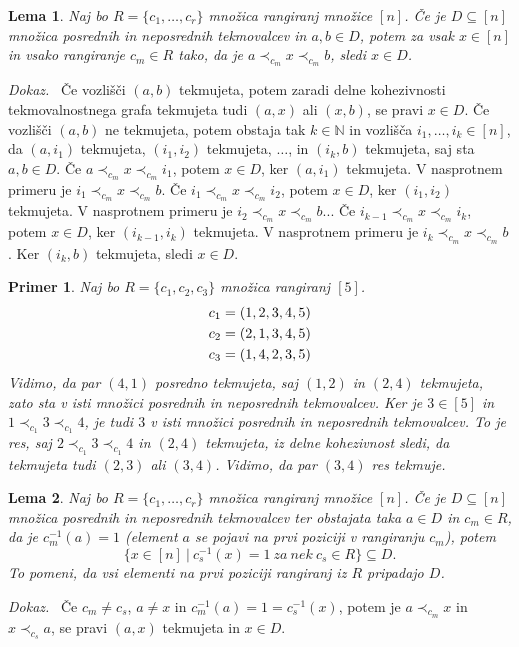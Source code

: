\documentclass[a4paper, 12pt]{book}
\newtheorem{lema}{Lema}[chapter]
\newtheorem{primer}{Primer}[chapter]
\newenvironment{dokaz}{\emph{Dokaz.}\ }{\hspace{\fill}{$\Box$}}
\begin{document}
\begin{lema}
\label{lema_algoritem_posredni_tekmovalci_1}
    Naj bo $R = \{ c_1, \dots, c_r \}$ množica rangiranj množice $[n]$. Če je $D \subseteq [n]$ množica posrednih in neposrednih tekmovalcev in $a, b \in D$, potem za vsak $x \in [n]$ in vsako rangiranje $c_m \in R$ tako, da je $a \prec_{c_m} x \prec_{c_m} b$, sledi $x \in D$.
\end{lema}
\begin{dokaz}
    Če vozlišči $(a, b)$ tekmujeta, potem zaradi delne kohezivnosti tekmovalnostnega grafa tekmujeta tudi $(a, x)$ ali $(x, b)$, se pravi $x \in D$. Če vozlišči $(a, b)$ ne tekmujeta, potem obstaja tak $k \in \mathbb{N}$ in vozlišča $i_1, \dots, i_k \in [n]$, da $(a, i_1)$ tekmujeta, $(i_1, i_2)$ tekmujeta, $\dots$, in $(i_k, b)$ tekmujeta, saj sta $a,b \in D$. Če $a \prec_{c_m} x \prec_{c_m} i_1$, potem $x \in D$, ker $(a, i_1)$ tekmujeta. V nasprotnem primeru je $i_1 \prec_{c_m} x \prec_{c_m} b$. Če $i_1 \prec_{c_m} x \prec_{c_m} i_2$, potem $x \in D$, ker $(i_1, i_2)$ tekmujeta. V nasprotnem primeru je $i_2 \prec_{c_m} x \prec_{c_m} b$... Če $i_{k-1} \prec_{c_m} x \prec_{c_m} i_k$, potem $x \in D$, ker $(i_{k-1}, i_k)$ tekmujeta. V nasprotnem primeru je $i_k \prec_{c_m} x \prec_{c_m} b$. Ker $(i_k, b)$ tekmujeta, sledi $x \in D$.
\end{dokaz}

\begin{primer}
    Naj bo $R = \{ c_1, c_2, c_3\}$ množica rangiranj $[5]$.
    \begin{align}
        c_1 &= (1, 2, 3, 4, 5) \notag\\
        c_2 &= (2, 1, 3, 4, 5) \notag\\
        c_3 &= (1, 4, 2, 3, 5) \notag
    \end{align}
    Vidimo, da par $(4, 1)$ posredno tekmujeta, saj $(1, 2)$ in $(2, 4)$ tekmujeta, zato sta v isti množici posrednih in neposrednih tekmovalcev. Ker je $3 \in [5]$ in $1 \prec_{c_1} 3 \prec_{c_1} 4$, je tudi $3$ v isti množici posrednih in neposrednih tekmovalcev. To je res, saj $2 \prec_{c_1} 3 \prec_{c_1} 4$ in $(2, 4)$ tekmujeta, iz delne kohezivnost sledi, da tekmujeta tudi $(2, 3)$ ali $(3, 4)$. Vidimo, da par $(3, 4)$ res tekmuje.
\end{primer}

\begin{lema}
\label{lema_algoritem_posredni_tekmovalci_2}
    Naj bo $R = \{ c_1, \dots, c_r \}$ množica rangiranj množice $[n]$. Če je $D \subseteq [n]$ množica posrednih in neposrednih tekmovalcev ter obstajata taka $a \in D$ in  $c_m \in R$, da je $c_m^{-1}(a) = 1$ (element $a$ se pojavi na prvi poziciji v rangiranju $c_m$), potem 
    \[
        \{ x \in [n] \ | \ c_s^{-1}(x) = 1 \ za \ nek \ c_s \in R \} \subseteq D.    
    \]
    To pomeni, da vsi elementi na prvi poziciji rangiranj iz $R$ pripadajo $D$.
\end{lema}
\begin{dokaz}
    Če $c_m \neq c_s$,  $a \neq x$ in $c_m^{-1}(a) = 1 = c_s^{-1}(x)$, potem je $a \prec_{c_m} x$ in $x \prec_{c_s} a$, se pravi $(a, x)$ tekmujeta in $x \in D$. 
\end{dokaz}
\end{document}
